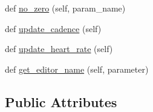 \begin{DoxyCompactItemize}
\item 
def \hyperlink{classride__parameters_1_1ride__parameters_a59308806857a2e4a38b84ee068d1c4ac}{no\+\_\+zero} (self, param\+\_\+name)
\item 
def \hyperlink{classride__parameters_1_1ride__parameters_a53de3656e5b9ac567321d67563c94b7f}{update\+\_\+cadence} (self)
\item 
def \hyperlink{classride__parameters_1_1ride__parameters_a1457499322e06e3cd08adcd6396dccaf}{update\+\_\+heart\+\_\+rate} (self)
\item 
def \hyperlink{classride__parameters_1_1ride__parameters_a684e83cbdc66d75679e4ef42b20f10b0}{get\+\_\+editor\+\_\+name} (self, parameter)
\end{DoxyCompactItemize}
\subsection*{Public Attributes}
